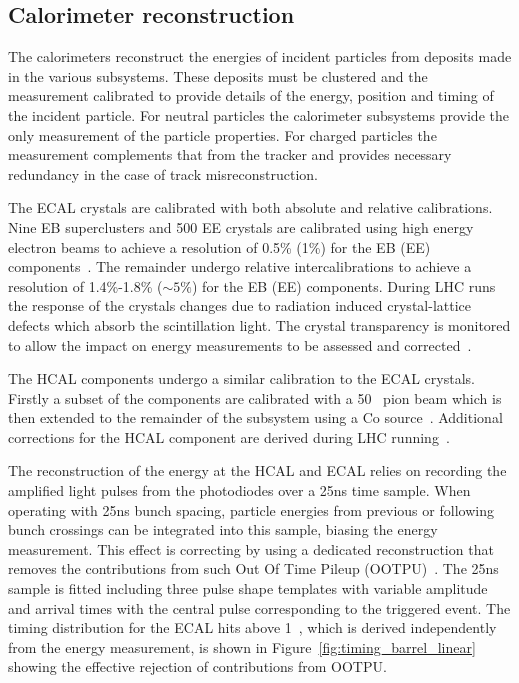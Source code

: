 \subsection{Calorimeter reconstruction}

The calorimeters reconstruct the energies of incident particles from deposits made in the 
various subsystems. These deposits must be clustered and the measurement calibrated to provide 
details of the energy, position and timing of the incident particle.
For neutral particles the calorimeter subsystems provide the only measurement of
the particle properties. For charged particles the measurement complements that
from the tracker and provides necessary redundancy in the case of track
misreconstruction.

The ECAL crystals are calibrated with both absolute and relative calibrations. Nine EB superclusters
and 500 EE crystals are calibrated using high energy electron beams to achieve a 
resolution of 0.5\% (1\%) for the EB (EE) components~\cite{ecal_calib}. 
The remainder undergo relative intercalibrations to achieve a resolution of 1.4\%-1.8\% ($\sim5\%$) 
for the EB (EE) components. During LHC runs the response of the crystals changes due to 
radiation induced crystal-lattice defects which absorb the scintillation light. 
The crystal transparency is monitored to allow the impact on energy measurements to
be assessed and corrected~\cite{ecal_calib}. 

The HCAL components undergo a similar calibration to the ECAL crystals. Firstly a subset of the 
components are calibrated with a 50 \GeV~pion beam which is then extended to the remainder of the 
subsystem using a Co source~\cite{hcal_beam}. Additional corrections
for the HCAL component are derived during LHC running~\cite{hcal_calib}.

The reconstruction of the energy at the HCAL and ECAL relies on recording the amplified 
light pulses from the photodiodes over a 25ns time sample. When operating with 25ns bunch 
spacing, particle energies from previous or following bunch crossings can be integrated
into this sample, biasing the energy measurement. This effect is correcting by using a 
dedicated reconstruction that removes the contributions from such Out Of Time Pileup 
(OOTPU)~\cite{hcal_timing,ecal_timing}. The 25ns sample is fitted including three pulse 
shape templates with variable amplitude and arrival times with the central pulse corresponding 
to the triggered event. The timing distribution for the ECAL hits above 1~\GeV, which is derived 
independently from the energy measurement, is shown in Figure~\ref{fig:timing_barrel_linear} 
showing the effective rejection of contributions from OOTPU.

